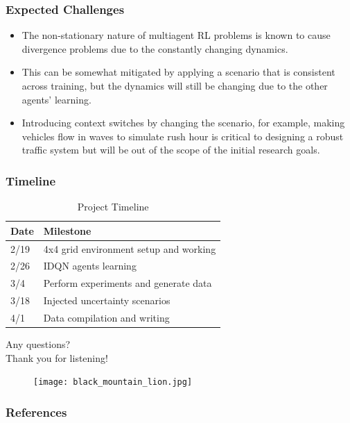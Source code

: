 \documentclass[compress,12pt]{beamer}
\begin{document}
\begin{frame}[bg=arguelles.png]
      \frametitle{Expected Challenges}
      \begin{itemize}
      \item The non-stationary nature of multiagent RL problems is known to cause divergence problems due to the constantly changing dynamics.
      \item This can be somewhat mitigated by applying a scenario that is consistent across training, but the dynamics will still be changing due to the other agents' learning\cite{DBLP:journals/corr/abs-2004-04778}.
      \item Introducing context switches by changing the scenario, for example, making vehicles flow in waves to simulate rush hour is critical to designing a robust traffic system but will be out of the scope of the initial research goals.
      \end{itemize}
\end{frame}

\begin{frame}[bg=arguelles.png]
      \frametitle{Timeline}

    \begin{table}[H]
    \centering
    \begin{tabular}{ll}
    \hline
    \textbf{Date} & \textbf{Milestone}             \\ \hline
    2/19 & 4x4 grid environment setup and working  \\
    2/26 & IDQN agents learning                    \\
    3/4  & Perform experiments and generate data   \\
    3/18 & Injected uncertainty scenarios          \\
    4/1  & Data compilation and writing            \\ \hline
    \end{tabular}
    \caption{Project Timeline}
    \label{tab:project_timeline}
    \end{table}

\end{frame}

\begin{frame}
      \centering
      Any questions? \\
      Thank you for listening!
      \vfill
    \begin{figure}[htbp]
      \centering
      \texttt{[image: black\_mountain\_lion.jpg]}
    \end{figure}
\end{frame}

\begin{frame}[allowframebreaks]
        \frametitle{References}
        
        
\end{frame}
\end{document}

